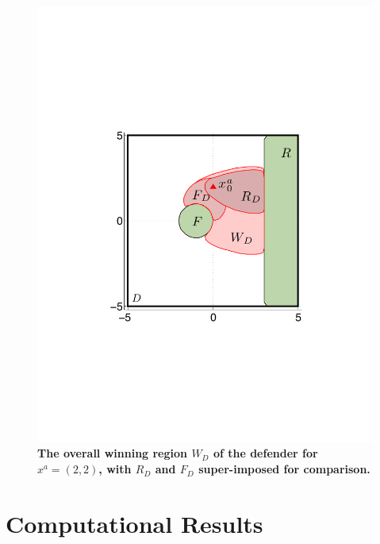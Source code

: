 \documentclass[letterpaper, 10 pt, conference]{ieeeconf}  %
\numberwithin{algorithm}{section}
\newcommand{\R}{\mathbb{R}}
\begin{document}
\begin{figure}[h]
	\centering
	\includegraphics[width=0.6\columnwidth]{figures/FCFR45.pdf}
	\caption{\textbf{The overall winning region $W_D$ of the defender for $x^a = (2,2)$, with $R_D$ and $F_D$ super-imposed for comparison.}}
	\label{fig:defenderWinSet}
\end{figure}
\section{Computational Results}
\label{sec:results}

\end{document}

